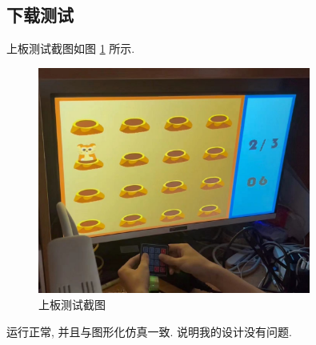 \subsection{下载测试}

上板测试截图如图 \ref{fig:game} 所示.

\begin{figure}[htbp]
  \centering
  \includegraphics[width=0.8\textwidth]{res/img/validation.jpg}
  \caption{上板测试截图}
  \label{fig:game}
\end{figure}

运行正常, 并且与图形化仿真一致. 说明我的设计没有问题.
